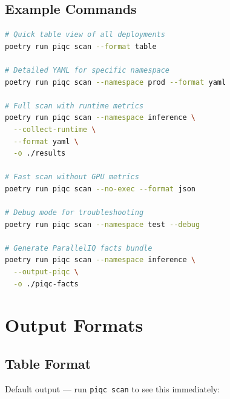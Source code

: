 \documentclass[11pt,a4paper]{article}
\begin{document}
\subsection{Example Commands}

\begin{lstlisting}[language=bash,basicstyle=\ttfamily\footnotesize]
# Quick table view of all deployments
poetry run piqc scan --format table

# Detailed YAML for specific namespace
poetry run piqc scan --namespace prod --format yaml

# Full scan with runtime metrics
poetry run piqc scan --namespace inference \
  --collect-runtime \
  --format yaml \
  -o ./results

# Fast scan without GPU metrics
poetry run piqc scan --no-exec --format json

# Debug mode for troubleshooting
poetry run piqc scan --namespace test --debug

# Generate ParallelIQ facts bundle
poetry run piqc scan --namespace inference \
  --output-piqc \
  -o ./piqc-facts
\end{lstlisting}

\section{Output Formats}

\subsection{Table Format}

Default output — run \texttt{piqc scan} to see this immediately:
\end{document}
